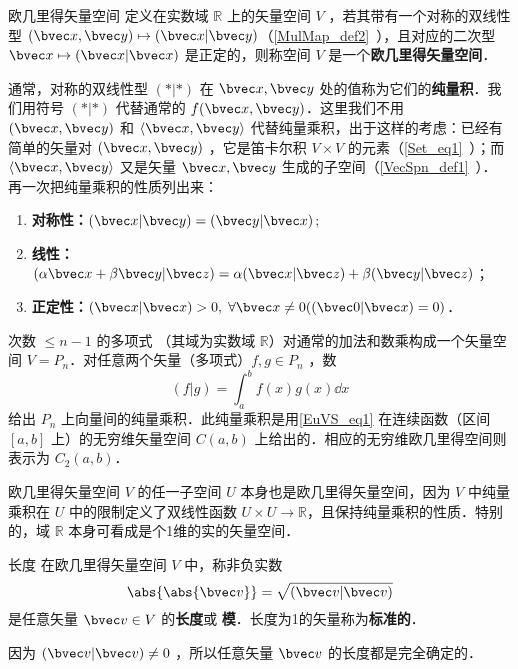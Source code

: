 
\begin{issues}
\issueMissDepend%
\end{issues}

\begin{definition}{欧几里得矢量空间}
定义在实数域 $\mathbb R$ 上的矢量空间 $V$ ，若其带有一个对称的双线性型 $(\bvec x,\bvec y)\mapsto(\bvec x|\bvec y)$（\autoref{MulMap_def2}~），且对应的二次型 $\bvec x\mapsto(\bvec x|\bvec x)$ 是正定的，则称空间 $V$ 是一个\textbf{欧几里得矢量空间}．
\end{definition}
通常，对称的双线性型 $(*|*)$ 在 $\bvec x,\bvec y$ 处的值称为它们的\textbf{纯量积}．我们用符号 $(*|*)$ 代替通常的 $f(\bvec x,\bvec y)$．这里我们不用 $(\bvec x,\bvec y)$ 和 $\langle\bvec x,\bvec y\rangle$ 代替纯量乘积，出于这样的考虑：已经有简单的矢量对 $(\bvec x,\bvec y)$ ，它是笛卡尔积 $V\times V$ 的元素（\autoref{Set_eq1}~）；而 $\langle \bvec x,\bvec y\rangle $ 又是矢量 $\bvec x,\bvec y$ 生成的子空间（\autoref{VecSpn_def1}~）．
再一次把纯量乘积的性质列出来：
\begin{enumerate}
\item \textbf{对称性：}$(\bvec x|\bvec y)=(\bvec y|\bvec x)$;
\item \textbf{线性：}$(\alpha\bvec x+\beta\bvec y|\bvec z)=\alpha(\bvec x|\bvec z)+\beta(\bvec y|\bvec z)$；
\item \textbf{正定性：}$(\bvec x|\bvec x)>0,\;\forall\bvec x\neq0((\bvec 0|\bvec x)=0)$．
\end{enumerate}
\begin{example}{}\label{EuVS_ex1}
次数 $\leq n-1$ 的多项式 （其域为实数域 $\mathbb R$）对通常的加法和数乘构成一个矢量空间 $V=P_n$．对任意两个矢量（多项式）$f,g\in P_n$ ，数 
\begin{equation}\label{EuVS_eq1}
(f|g)=\int_a^b f(x)g(x)\dd x
\end{equation}
给出 $P_n$ 上向量间的纯量乘积．此纯量乘积是用\autoref{EuVS_eq1} 在连续函数（区间 $[a,b]$ 上）的无穷维矢量空间 $C(a,b)$ 上给出的．相应的无穷维欧几里得空间则表示为 $C_2(a,b)$．
\end{example}
\begin{example}{}
欧几里得矢量空间 $V$ 的任一子空间 $U$ 本身也是欧几里得矢量空间，因为 $V$ 中纯量乘积在 $U$ 中的限制定义了双线性函数 $U\times U\rightarrow\mathbb R$，且保持纯量乘积的性质．特别的，域 $\mathbb R$ 本身可看成是个1维的实的矢量空间．
\end{example}
\begin{definition}{长度}
在欧几里得矢量空间 $V$ 中，称非负实数
\begin{equation}
\abs{\abs{\bvec v}}=\sqrt{(\bvec v|\bvec v)}
\end{equation}
是任意矢量 $\bvec v\in V$ 的\textbf{长度}或 \textbf{模}．长度为1的矢量称为\textbf{标准的}．
\end{definition}
因为 $(\bvec v|\bvec v)\neq0$ ，所以任意矢量 $\bvec v$ 的长度都是完全确定的．

